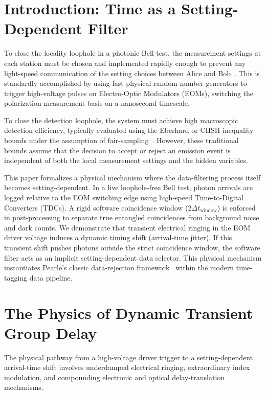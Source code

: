 \documentclass[aps,pra,reprint,superscriptaddress,amsmath,amssymb,floatfix]{revtex4-2}
\begin{document}
\maketitle

\section{Introduction: Time as a Setting-Dependent Filter}

To close the locality loophole in a photonic Bell test, the measurement settings at each station must be chosen and implemented rapidly enough to prevent any light-speed communication of the setting choices between Alice and Bob~\cite{shalm2015, giustina2015}. This is standardly accomplished by using fast physical random number generators to trigger high-voltage pulses on Electro-Optic Modulators (EOMs), switching the polarization measurement basis on a nanosecond timescale.

To close the detection loophole, the system must achieve high macroscopic detection efficiency, typically evaluated using the Eberhard or CHSH inequality bounds under the assumption of fair-sampling~\cite{pearle1970}. However, these traditional bounds assume that the decision to accept or reject an emission event is independent of both the local measurement settings and the hidden variables.

This paper formalizes a physical mechanism where the data-filtering process itself becomes setting-dependent. In a live loophole-free Bell test, photon arrivals are logged relative to the EOM switching edge using high-speed Time-to-Digital Converters (TDCs). A rigid software coincidence window ($2\Delta t_{\text{window}}$) is enforced in post-processing to separate true entangled coincidences from background noise and dark counts. We demonstrate that transient electrical ringing in the EOM driver voltage induces a dynamic timing shift (arrival-time jitter). If this transient shift pushes photons outside the strict coincidence window, the software filter acts as an implicit setting-dependent data selector. This physical mechanism instantiates Pearle's classic data-rejection framework~\cite{pearle1970} within the modern time-tagging data pipeline.

\section{The Physics of Dynamic Transient Group Delay}

The physical pathway from a high-voltage driver trigger to a setting-dependent arrival-time shift involves underdamped electrical ringing, extraordinary index modulation, and compounding electronic and optical delay-translation mechanisms.
\end{document}
